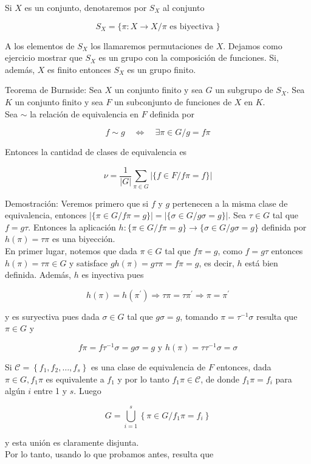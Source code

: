 \documentclass[10pt]{article}
\begin{document}
Si $X$ es un conjunto, denotaremos por $S_{X}$ al conjunto

$$
S_{X}=\{\pi: X \longrightarrow X / \pi \text { es biyectiva }\}
$$

A los elementos de $S_{X}$ los llamaremos permutaciones de $X$. Dejamos como ejercicio mostrar que $S_{X}$ es un grupo con la composición de funciones. Si, además, $X$ es finito entonces $S_{X}$ es un grupo finito.

Teorema de Burnside: Sea $X$ un conjunto finito y sea $G$ un subgrupo de $S_{X}$. Sea $K$ un conjunto finito y sea $F$ un subconjunto de funciones de $X$ en $K$.\\
Sea $\sim$ la relación de equivalencia en $F$ definida por

$$
f \sim g \quad \Longleftrightarrow \quad \exists \pi \in G / g=f \pi
$$

Entonces la cantidad de clases de equivalencia es

$$
\nu=\frac{1}{|G|} \sum_{\pi \in G}|\{f \in F / f \pi=f\}|
$$

Demostración: Veremos primero que si $f$ y $g$ pertenecen a la misma clase de equivalencia, entonces $|\{\pi \in G / f \pi=g\}|=|\{\sigma \in G / g \sigma=g\}|$. Sea $\tau \in G$ tal que $f=g \tau$. Entonces la aplicación $h:\{\pi \in G / f \pi=g\} \longrightarrow\{\sigma \in G / g \sigma=g\}$ definida por $h(\pi)=\tau \pi$ es una biyección.\\
En primer lugar, notemos que dada $\pi \in G$ tal que $f \pi=g$, como $f=g \tau$ entonces $h(\pi)=\tau \pi \in G$ y satisface $g h(\pi)=g \tau \pi=f \pi=g$, es decir, $h$ está bien definida. Además, $h$ es inyectiva pues

$$
h(\pi)=h\left(\pi^{\prime}\right) \Longrightarrow \tau \pi=\tau \pi^{\prime} \Longrightarrow \pi=\pi^{\prime}
$$

y es suryectiva pues dada $\sigma \in G$ tal que $g \sigma=g$, tomando $\pi=\tau^{-1} \sigma$ resulta que $\pi \in G$ y

$$
f \pi=f \tau^{-1} \sigma=g \sigma=g \text { y } h(\pi)=\tau \tau^{-1} \sigma=\sigma
$$

Si $\mathcal{C}=\left\{f_{1}, f_{2}, \ldots, f_{s}\right\}$ es una clase de equivalencia de $F$ entonces, dada $\pi \in G, f_{1} \pi$ es equivalente a $f_{1}$ y por lo tanto $f_{1} \pi \in \mathcal{C}$, de donde $f_{1} \pi=f_{i}$ para algún $i$ entre 1 y $s$. Luego

$$
G=\bigcup_{i=1}^{s}\left\{\pi \in G / f_{1} \pi=f_{i}\right\}
$$

y esta unión es claramente disjunta.\\
Por lo tanto, usando lo que probamos antes, resulta que
\end{document}
